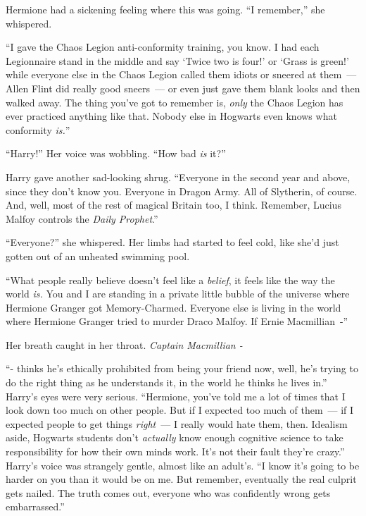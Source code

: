 Hermione had a sickening feeling where this was going. ``I remember,'' she whispered.

``I gave the Chaos Legion anti-conformity training, you know. I had each Legionnaire stand in the middle and say `Twice two is four!' or `Grass is green!' while everyone else in the Chaos Legion called them idiots or sneered at them~--- Allen Flint did really good sneers~--- or even just gave them blank looks and then walked away. The thing you've got to remember is, \emph{only} the Chaos Legion has ever practiced anything like that. Nobody else in Hogwarts even knows what conformity \emph{is.}''

``Harry!'' Her voice was wobbling. ``How bad \emph{is} it?''

Harry gave another sad-looking shrug. ``Everyone in the second year and above, since they don't know you. Everyone in Dragon Army. All of Slytherin, of course. And, well, most of the rest of magical Britain too, I think. Remember, Lucius Malfoy controls the \emph{Daily Prophet}.''

``Everyone?'' she whispered. Her limbs had started to feel cold, like she'd just gotten out of an unheated swimming pool.

``What people really believe doesn't feel like a \emph{belief}, it feels like the way the world \emph{is.} You and I are standing in a private little bubble of the universe where Hermione Granger got Memory-Charmed. Everyone else is living in the world where Hermione Granger tried to murder Draco Malfoy. If Ernie Macmillian~-''

Her breath caught in her throat. \emph{Captain Macmillian -}

``- thinks he's ethically prohibited from being your friend now, well, he's trying to do the right thing as he understands it, in the world he thinks he lives in.'' Harry's eyes were very serious. ``Hermione, you've told me a lot of times that I look down too much on other people. But if I expected too much of them~--- if I expected people to get things \emph{right}~--- I really would hate them, then. Idealism aside, Hogwarts students don't \emph{actually} know enough cognitive science to take responsibility for how their own minds work. It's not their fault they're crazy.'' Harry's voice was strangely gentle, almost like an adult's. ``I know it's going to be harder on you than it would be on me. But remember, eventually the real culprit gets nailed. The truth comes out, everyone who was confidently wrong gets embarrassed.''

